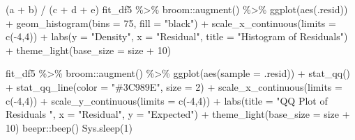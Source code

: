 \documentclass[
  english,
  man,floatsintext]{apa6}
\newenvironment{Shaded}{\begin{snugshade}}{\end{snugshade}}
\newcommand{\AttributeTok}[1]{\textcolor[rgb]{0.77,0.63,0.00}{#1}}
\newcommand{\DecValTok}[1]{\textcolor[rgb]{0.00,0.00,0.81}{#1}}
\newcommand{\FunctionTok}[1]{\textcolor[rgb]{0.00,0.00,0.00}{#1}}
\newcommand{\NormalTok}[1]{#1}
\newcommand{\SpecialCharTok}[1]{\textcolor[rgb]{0.00,0.00,0.00}{#1}}
\newcommand{\StringTok}[1]{\textcolor[rgb]{0.31,0.60,0.02}{#1}}
\begin{document}
\begin{Shaded}
\begin{Highlighting}[]
\NormalTok{(a }\SpecialCharTok{+}\NormalTok{ b) }\SpecialCharTok{/}\NormalTok{ (c }\SpecialCharTok{+}\NormalTok{ d }\SpecialCharTok{+}\NormalTok{ e) }
\NormalTok{fit\_df5 }\SpecialCharTok{\%\textgreater{}\%} 
\NormalTok{  broom}\SpecialCharTok{::}\FunctionTok{augment}\NormalTok{() }\SpecialCharTok{\%\textgreater{}\%} 
  \FunctionTok{ggplot}\NormalTok{(}\FunctionTok{aes}\NormalTok{(.resid)) }\SpecialCharTok{+} 
  \FunctionTok{geom\_histogram}\NormalTok{(}\AttributeTok{bins =} \DecValTok{75}\NormalTok{, }\AttributeTok{fill =} \StringTok{"black"}\NormalTok{) }\SpecialCharTok{+}
  \FunctionTok{scale\_x\_continuous}\NormalTok{(}\AttributeTok{limits =} \FunctionTok{c}\NormalTok{(}\SpecialCharTok{{-}}\DecValTok{4}\NormalTok{,}\DecValTok{4}\NormalTok{)) }\SpecialCharTok{+} 
  \FunctionTok{labs}\NormalTok{(}\AttributeTok{y =} \StringTok{"Density"}\NormalTok{, }\AttributeTok{x =} \StringTok{"Residual"}\NormalTok{, }\AttributeTok{title =} \StringTok{"Histogram of Residuals"}\NormalTok{) }\SpecialCharTok{+} 
  \FunctionTok{theme\_light}\NormalTok{(}\AttributeTok{base\_size =}\NormalTok{ size }\SpecialCharTok{+} \DecValTok{10}\NormalTok{)}


\NormalTok{fit\_df5 }\SpecialCharTok{\%\textgreater{}\%} 
\NormalTok{  broom}\SpecialCharTok{::}\FunctionTok{augment}\NormalTok{() }\SpecialCharTok{\%\textgreater{}\%} 
  \FunctionTok{ggplot}\NormalTok{(}\FunctionTok{aes}\NormalTok{(}\AttributeTok{sample =}\NormalTok{ .resid)) }\SpecialCharTok{+} 
  \FunctionTok{stat\_qq}\NormalTok{() }\SpecialCharTok{+}
  \FunctionTok{stat\_qq\_line}\NormalTok{(}\AttributeTok{color =} \StringTok{"\#3C989E"}\NormalTok{, }\AttributeTok{size =} \DecValTok{2}\NormalTok{) }\SpecialCharTok{+} 
\FunctionTok{scale\_x\_continuous}\NormalTok{(}\AttributeTok{limits =} \FunctionTok{c}\NormalTok{(}\SpecialCharTok{{-}}\DecValTok{4}\NormalTok{,}\DecValTok{4}\NormalTok{)) }\SpecialCharTok{+} 
\FunctionTok{scale\_y\_continuous}\NormalTok{(}\AttributeTok{limits =} \FunctionTok{c}\NormalTok{(}\SpecialCharTok{{-}}\DecValTok{4}\NormalTok{,}\DecValTok{4}\NormalTok{)) }\SpecialCharTok{+} 
  \FunctionTok{labs}\NormalTok{(}\AttributeTok{title =} \StringTok{"QQ Plot of Residuals "}\NormalTok{, }\AttributeTok{x =} \StringTok{"Residual"}\NormalTok{, }\AttributeTok{y =} \StringTok{"Expected"}\NormalTok{) }\SpecialCharTok{+} 
  \FunctionTok{theme\_light}\NormalTok{(}\AttributeTok{base\_size =}\NormalTok{ size }\SpecialCharTok{+} \DecValTok{10}\NormalTok{)}
\NormalTok{beepr}\SpecialCharTok{::}\FunctionTok{beep}\NormalTok{()}
\FunctionTok{Sys.sleep}\NormalTok{(}\DecValTok{1}\NormalTok{)}
\end{Highlighting}
\end{Shaded}
\end{document}
